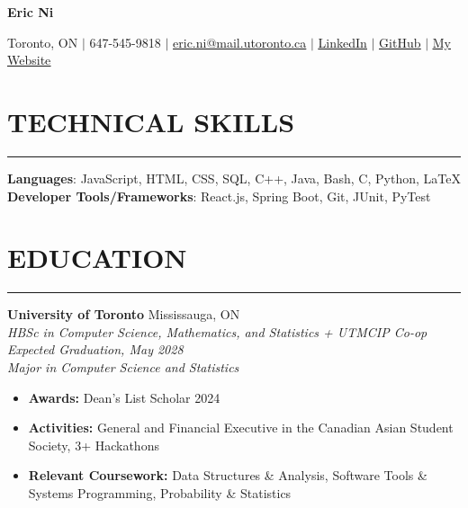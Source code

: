 \documentclass[letterpaper,10.5pt]{article}
\begin{document}
\begin{center}
    \textbf{\huge{Eric Ni}} \\[5pt]
\end{center}

\begin{center}
    \small {Toronto, ON $|$ 647-545-9818 $|$ \underline {eric.ni@mail.utoronto.ca} $|$ \underline{\href{https://www.linkedin.com/in/eric-ni-017985225}{LinkedIn}} $|$ \underline{\href{https://github.com/ericnii}{GitHub}} $|$ \underline{\href{https://ericnii.github.io/my-website/}{My Website}}}
\end{center}


\section*{\textnormal{TECHNICAL SKILLS}}\vspace{-19pt}
\noindent\rule{\textwidth}{0.4 pt}
\textbf{Languages}: JavaScript, HTML, CSS, SQL, C++, Java, Bash, C, Python, LaTeX\\
\textbf{Developer Tools/Frameworks}: React.js, Spring Boot, Git, JUnit, PyTest

\section*{\textnormal{EDUCATION}}\vspace{-19pt}
\noindent\rule{\textwidth}{0.4 pt}
\textbf{University of Toronto}
\hfill
Mississauga, ON \\
\emph{HBSc in Computer Science, Mathematics, and Statistics + UTMCIP Co-op}
\hfill
\emph{Expected Graduation, May 2028}\\
\emph{Major in Computer Science and Statistics}
\begin{itemize}
    \setlength\itemsep{1pt}
    \item \textbf{Awards:} Dean's List Scholar 2024
    \item \textbf{Activities:} General and Financial Executive in the Canadian Asian Student Society, 3+ Hackathons
    \item \textbf{Relevant Coursework:} Data Structures \& Analysis, Software Tools \& Systems Programming,  Probability \& Statistics
\end{itemize}

\end{document}
